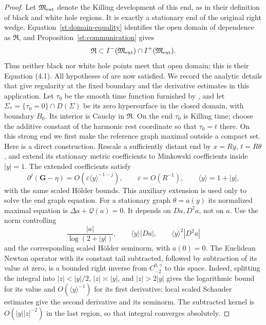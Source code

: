 \begin{proof}
Let $\mathfrak M_{\rm ext}$ denote the Killing development of
this end, as in their definition of black and white hole regions.
It is exactly a stationary end of the original right wedge.
Equation~\eqref{st:domain-equality} identifies the open domain of
dependence as $\mathfrak R$, and
Proposition~\ref{st:communication} gives
\[
 \mathfrak R\subset I^-(\mathfrak M_{\rm ext})
                  \cap I^+(\mathfrak M_{\rm ext}).
\]
Thus neither black nor white hole points meet that open domain;
this is their Equation (4.1).  All hypotheses of
\cite[Theorem~4.2]{ChruscielWald1994} are now satisfied.
We record the analytic details that give regularity at the fixed
boundary and the derivative estimates in this application.  Let
$\tau_0$ be the smooth time function furnished by
\cite[Proposition~4.2]{ChruscielWald1994}, and let
$\Sigma_* = \{\tau_0=0\}\cap D(\Sigma)$ be its zero hypersurface
in the closed domain, with boundary $B_0$.  Its interior is Cauchy
in $\mathfrak R$.  On the end $\tau_0$ is Killing time; choose
the additive constant of the harmonic rest coordinate so that
$\tau_0=t$ there.  On this strong end we first make the reference
graph maximal outside a compact set.  Here is a direct construction.  Rescale a
sufficiently distant end by $x=R y$, $t=R\theta$, and extend its
stationary metric coefficients to Minkowski coefficients inside
$|y|=1$.  The extended coefficients satisfy
\[
 \partial^j(\mathbf G-\eta)
   =O(\varepsilon\langle y\rangle^{-1-j}),\qquad
 \varepsilon=O(R^{-1}),\qquad \langle y\rangle=1+|y|,
\]
with the same scaled H\"older bounds.  This auxiliary extension is
used only to solve the end graph equation.  For a stationary graph
$\theta=a(y)$ its normalized maximal equation is
$\Delta a+\mathcal Q(a)=0$.  It depends on $Da,D^2a$, not on $a$.
Use the norm controlling
\[
 \frac{|a|}{\log(2+|y|)},\qquad
 \langle y\rangle|Da|,\qquad
 \langle y\rangle^2|D^2a|
\]
and the corresponding scaled H\"older seminorm, with $a(0)=0$.
The Euclidean Newton operator with its constant tail subtracted,
followed by subtraction of its value at zero, is a bounded right
inverse from $C^{0,\gamma}_{-2}$ to this space.  Indeed, splitting
the integral into $|z|<|y|/2$, $|z|\asymp|y|$, and
$|z|>2|y|$ gives the logarithmic bound for its value and
$O(\langle y\rangle^{-1})$ for its first derivative; local scaled
Schauder estimates give the second derivative and its seminorm.
The subtracted kernel is $O(|y||z|^{-2})$ in the last region,
so that integral converges absolutely.


\end{proof}
